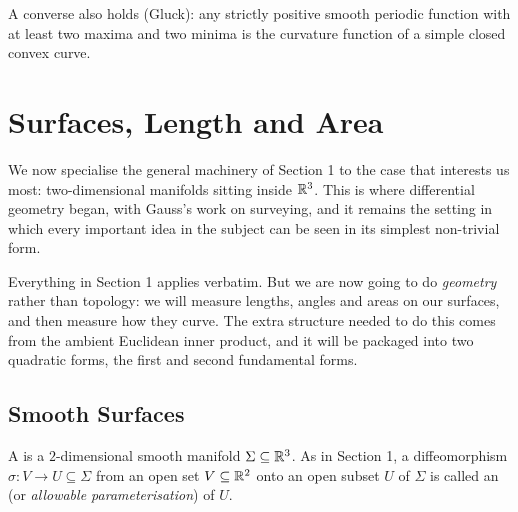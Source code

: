 \documentclass[a4paper]{scrartcl}
\begin{document}
\begin{center}
\end{center}

\begin{remark}
    A converse also holds (Gluck): any strictly positive smooth periodic function with at least two maxima and two minima is the curvature function of a simple closed convex curve.
\end{remark}


\section{Surfaces, Length and Area}

We now specialise the general machinery of Section 1 to the case that interests us most: two-dimensional manifolds sitting inside $\mathbb{R}^3$. This is where differential geometry began, with Gauss's work on surveying, and it remains the setting in which every important idea in the subject can be seen in its simplest non-trivial form.

Everything in Section 1 applies verbatim. But we are now going to do \emph{geometry} rather than topology: we will measure lengths, angles and areas on our surfaces, and then measure how they curve. The extra structure needed to do this comes from the ambient Euclidean inner product, and it will be packaged into two quadratic forms, the first and second fundamental forms.

\subsection{Smooth Surfaces}

\begin{definition}
    A  is a $2$-dimensional smooth manifold $\Sigma \subseteq \mathbb{R}^3$. As in Section 1, a diffeomorphism $\sigma: V \rightarrow U \subseteq \Sigma$ from an open set $V \subseteq \mathbb{R}^2$ onto an open subset $U$ of $\Sigma$ is called an  (or \emph{allowable parameterisation}) of $U$.
\end{definition}
\end{document}
